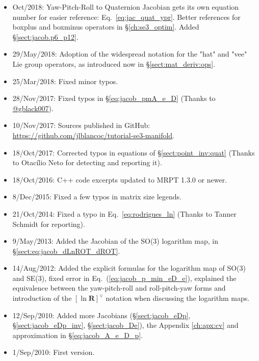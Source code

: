 \documentclass[a4paper,11pt]{report}
\begin{document}
\begin{itemize}
 \item Oct/2018: Yaw-Pitch-Roll to Quaternion Jacobian gets its own equation number for easier reference: Eq.~\ref{eq:jac_quat_ypr}. Better references for boxplus and boxminus operators in \S\ref{ch:se3_optim}. Added \S\ref{sect:jacob.p6_p12}.
	
 \item 29/May/2018: Adoption of the widespread notation for the "hat" and "vee" Lie group operators, as introduced now in \S\ref{sect:mat_deriv:ops}.

 \item 25/Mar/2018: Fixed minor typos.
  
 \item 28/Nov/2017: Fixed typos in \S\ref{eq:jacob_pmA_e_D} (Thanks to \href{https://github.com/gblack007}{@gblack007}).

 \item 10/Nov/2017: Sources published in GitHub: \\
    \url{https://github.com/jlblancoc/tutorial-se3-manifold}.

 \item 18/Oct/2017: Corrected typos in equations of \S\ref{sect:point_inv:quat} (Thanks to Otacílio Neto for detecting and reporting it).

 \item 18/Oct/2016: C++ code excerpts updated to MRPT 1.3.0 or newer.

 \item 8/Dec/2015: Fixed a few typos in matrix size legends.

 \item 21/Oct/2014: Fixed a typo in Eq.~\ref{eq:rodrigues_ln} (Thanks to Tanner Schmidt for reporting).

 \item 9/May/2013: Added the Jacobian of the SO(3) logarithm map, in \S\ref{sect:eq:jacob_dLnROT_dROT}.

 \item 14/Aug/2012: Added the explicit formulas for the logarithm map of SO(3) and SE(3),
    fixed error in Eq.~(\ref{eq:jacob_p_min_eD_e}), explained the equivalence between the yaw-pitch-roll
and roll-pitch-yaw forms and introduction of the $\left[ \ln \mathbf{R} \right]^\vee$ notation
when discussing the logarithm maps.

 \item 12/Sep/2010: Added more Jacobians (\S\ref{sect:jacob_eDp},
\S\ref{sect:jacob_eDp_inv}, \S\ref{sect:jacob_De}),
         the Appendix \ref{ch:apx:cv} and approximation in \S\ref{eq:jacob_A_e_D_p}.

 \item 1/Sep/2010: First version.
\end{itemize}
\end{document}
